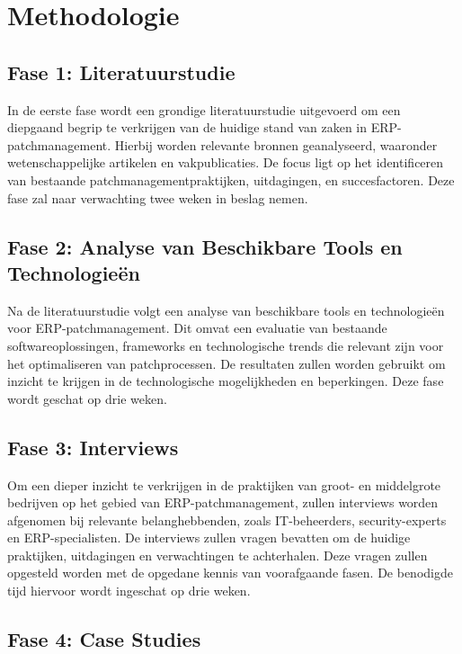 \section{Methodologie}%
\label{sec:methodologie}

\subsection{Fase 1: Literatuurstudie}

In de eerste fase wordt een grondige literatuurstudie uitgevoerd om een diepgaand begrip te verkrijgen van de huidige stand van zaken in ERP-patchmanagement. Hierbij worden relevante bronnen geanalyseerd, waaronder wetenschappelijke artikelen en vakpublicaties. De focus ligt op het identificeren van bestaande patchmanagementpraktijken, uitdagingen, en succesfactoren. Deze fase zal naar verwachting twee weken in beslag nemen.

\subsection{Fase 2: Analyse van Beschikbare Tools en Technologieën}

Na de literatuurstudie volgt een analyse van beschikbare tools en technologieën voor ERP-patchmanagement. Dit omvat een evaluatie van bestaande softwareoplossingen, frameworks en technologische trends die relevant zijn voor het optimaliseren van patchprocessen. De resultaten zullen worden gebruikt om inzicht te krijgen in de technologische mogelijkheden en beperkingen. Deze fase wordt geschat op drie weken.

\subsection{Fase 3: Interviews}

Om een dieper inzicht te verkrijgen in de praktijken van groot- en middelgrote bedrijven op het gebied van ERP-patchmanagement, zullen interviews worden afgenomen bij relevante belanghebbenden, zoals IT-beheerders, security-experts en ERP-specialisten. De interviews zullen vragen bevatten om de huidige praktijken, uitdagingen en verwachtingen te achterhalen. Deze vragen zullen opgesteld worden met de opgedane kennis van voorafgaande fasen. De benodigde tijd hiervoor wordt ingeschat op drie weken.

\subsection{Fase 4: Case Studies}

